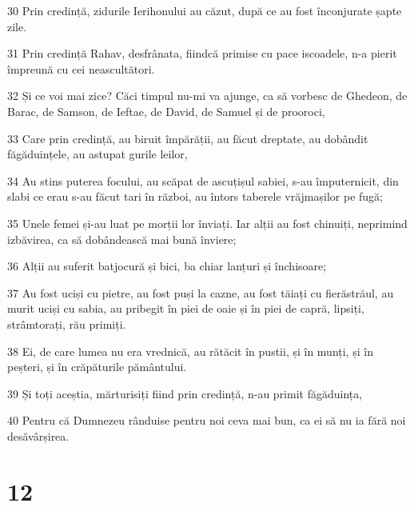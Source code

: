 \par 30 Prin credință, zidurile Ierihonului au căzut, după ce au fost înconjurate șapte zile.
\par 31 Prin credință Rahav, desfrânata, fiindcă primise cu pace iscoadele, n-a pierit împreună cu cei neascultători.
\par 32 Și ce voi mai zice? Căci timpul nu-mi va ajunge, ca să vorbesc de Ghedeon, de Barac, de Samson, de Ieftae, de David, de Samuel și de prooroci,
\par 33 Care prin credință, au biruit împărății, au făcut dreptate, au dobândit făgăduințele, au astupat gurile leilor,
\par 34 Au stins puterea focului, au scăpat de ascuțișul sabiei, s-au împuternicit, din slabi ce erau s-au făcut tari în război, au întors taberele vrăjmașilor pe fugă;
\par 35 Unele femei și-au luat pe morții lor înviați. Iar alții au fost chinuiți, neprimind izbăvirea, ca să dobândească mai bună înviere;
\par 36 Alții au suferit batjocură și bici, ba chiar lanțuri și închisoare;
\par 37 Au fost uciși cu pietre, au fost puși la cazne, au fost tăiați cu fierăstrăul, au murit uciși cu sabia, au pribegit în piei de oaie și în piei de capră, lipsiți, strâmtorați, rău primiți.
\par 38 Ei, de care lumea nu era vrednică, au rătăcit în pustii, și în munți, și în peșteri, și în crăpăturile pământului.
\par 39 Și toți aceștia, mărturisiți fiind prin credință, n-au primit făgăduința,
\par 40 Pentru că Dumnezeu rânduise pentru noi ceva mai bun, ca ei să nu ia fără noi desăvârșirea.

\chapter{12}

